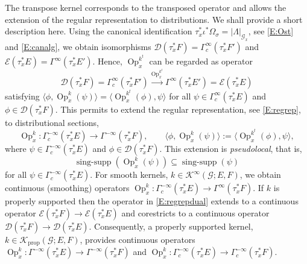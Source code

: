 \documentclass[reqno,12pt]{amsart}
\DeclareMathOperator{\Op}{Op}
\DeclareMathOperator\singsupp{sing-supp}
\newcommand\prop{\textrm{prop}}
\theoremstyle{plain}
\theoremstyle{definition}
\begin{document}
The transpose kernel corresponds to the transposed operator and allows the extension of the regular representation to distributions. 
We shall provide a short description here.
Using the canonical identification $\tau_x^*\iota^*\Omega_\sigma=|\Lambda|_{\mathcal G_x}$, see \eqref{E:Ost} and \eqref{E:canalg}, we obtain isomorphisms $\mathcal D(\tau_x^*F)=\Gamma^\infty_c(\tau_x^*F')$ and $\mathcal E(\tau_x^*E)=\Gamma^\infty(\tau_x^*E')$.
Hence, $\Op^{k^t}_x$ can be regarded as operator
\begin{equation}\label{E:regrepdual}
\mathcal D(\tau_x^*F)=\Gamma^\infty_c(\tau_x^*F')\xrightarrow{\Op_x^{k^t}}\Gamma^\infty(\tau_x^*E')=\mathcal E(\tau_x^*E)
\end{equation}
satisfying $\langle\phi,\Op_x^k(\psi)\rangle=\langle\Op^{k^t}_x(\phi),\psi\rangle$ for all $\psi\in\Gamma^\infty_c(\tau_x^*E)$ and $\phi\in\mathcal D(\tau_x^*F)$.
This permits to extend the regular representation, see \eqref{E:regrep}, to distributional sections,
\begin{equation}\label{E:Opkdistr}
\Op_x^k\colon\Gamma^{-\infty}_c(\tau_x^*E)\to\Gamma^{-\infty}(\tau_x^*F),
\qquad
\langle\phi,\Op_x^k(\psi)\rangle:=\langle\Op^{k^t}_x(\phi),\psi\rangle,
\end{equation}
where $\psi\in\Gamma^{-\infty}_c(\tau_x^*E)$ and $\phi\in\mathcal D(\tau_x^*F)$.
This extension is \emph{pseudolocal}, that is,
\begin{equation}\label{E:singsupp}
\singsupp(\Op_x^k(\psi))\subseteq\singsupp(\psi)
\end{equation}
for all $\psi\in\Gamma^{-\infty}_c(\tau_x^*E)$.
For smooth kernels, $k\in\mathcal K^\infty(\mathcal G;E,F)$, we obtain continuous (smoothing) operators $\Op_x^k\colon\Gamma^{-\infty}_c(\tau_x^*E)\to\Gamma^\infty(\tau_x^*F)$.
If $k$ is properly supported then the operator in \eqref{E:regrepdual} extends to a continuous operator $\mathcal E(\tau_x^*F)\to\mathcal E(\tau_x^*E)$ and corestricts to a continuous operator $\mathcal D(\tau_x^*F)\to\mathcal D(\tau_x^*E)$.
Consequently, a properly supported kernel, $k\in\mathcal K_\prop(\mathcal G;E,F)$, provides continuous operators $\Op_x^k\colon\Gamma^{-\infty}(\tau_x^*E)\to\Gamma^{-\infty}(\tau_x^*F)$ and $\Op^k_x\colon\Gamma^{-\infty}_c(\tau_x^*E)\to\Gamma^{-\infty}_c(\tau_x^*F)$.
\end{document}
